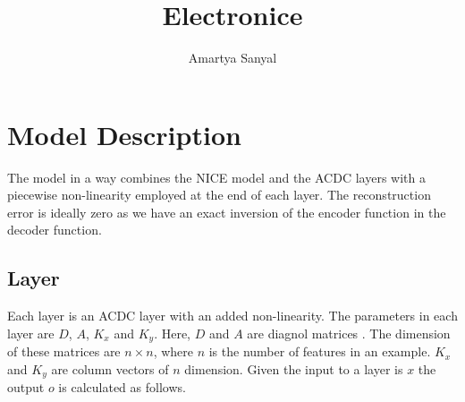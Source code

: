 \documentclass{article}
\title{Electronice}
\author{Amartya Sanyal}
\begin{document}
\maketitle
\section{Model Description}
The model in a way combines the NICE model and the ACDC layers with a piecewise non-linearity employed at the end of each layer. The reconstruction error is ideally zero as we have an exact inversion of the encoder function in the decoder function.
\subsection{Layer}
Each layer is an ACDC layer with an added non-linearity. The parameters in each layer are $D$, $A$, $K_x$ and $K_y$. Here, $D$ and $A$ are diagnol matrices . The dimension of these matrices are $n\times n$, where $n$ is the number of features in an example. $K_x$ and $K_y$ are column vectors of $n$ dimension. Given the input to a layer is $x$ the output $o$ is calculated as follows.
\end{document}
